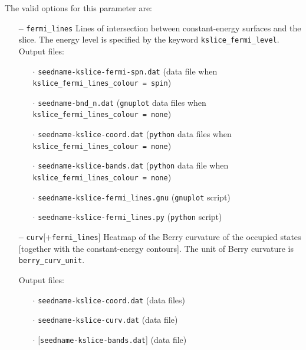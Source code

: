The valid options for this parameter are:
\begin{itemize}

\item[{\bf --}] \verb#fermi_lines# Lines of intersection between
  constant-energy surfaces and the slice. The energy level is
  specified by the keyword {\tt kslice\_fermi\_level}. Output files:

  \begin{itemize}

  \item[$\cdot$] {\tt seedname-kslice-fermi-spn.dat} (data file when
    {\tt kslice\_fermi\_lines\_colour = spin})

  \item[$\cdot$] {\tt seedname-bnd\_n.dat} ({\tt gnuplot} data files
    when {\tt kslice\_fermi\_lines\_colour = none})

  \item[$\cdot$] {\tt seedname-kslice-coord.dat} ({\tt python} data
    files when {\tt kslice\_fermi\_lines\_colour = none})

  \item[$\cdot$] {\tt seedname-kslice-bands.dat} ({\tt python} data
    file when {\tt kslice\_fermi\_lines\_colour = none})

  \item[$\cdot$] {\tt seedname-kslice-fermi\_lines.gnu} ({\tt gnuplot}
    script)

  \item[$\cdot$] {\tt seedname-kslice-fermi\_lines.py} ({\tt python}
    script)

  \end{itemize}

\item[{\bf --}] \verb#curv#[+\verb#fermi_lines#] Heatmap of the Berry
  curvature of the occupied states [together with the constant-energy
  contours]. The unit of Berry curvature is {\tt berry\_curv\_unit}.

Output files:

  \begin{itemize}

  \item[$\cdot$] {\tt seedname-kslice-coord.dat} (data files)
    
  \item[$\cdot$] {\tt seedname-kslice-curv.dat} (data file)

  \item[$\cdot$] [{\tt seedname-kslice-bands.dat}] (data file)
    

\end{itemize}
\end{itemize}
